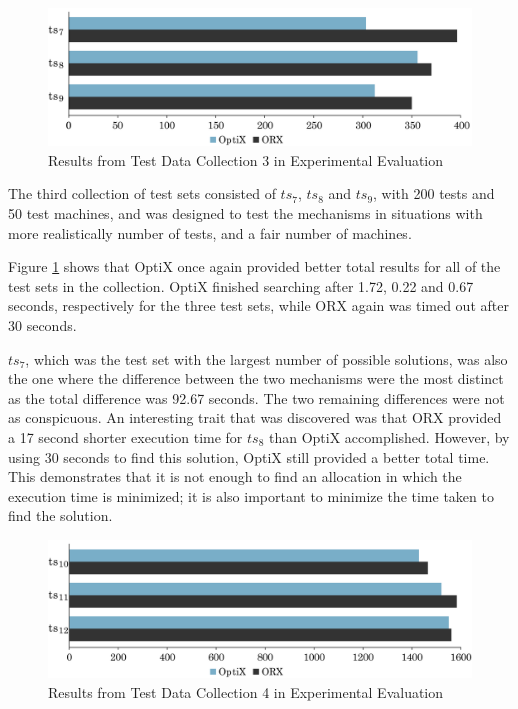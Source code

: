 \begin{figure}[b]
    \centering
    \includegraphics[width=\textwidth]{figures/test_results/3.pdf}
    \caption{Results from Test Data Collection 3 in Experimental Evaluation}
    \label{3rd_test_set}
\end{figure}

The third collection of test sets consisted of $ts_7$, $ts_8$ and $ts_9$, with 200 tests and 50 test machines, and was designed to test the mechanisms in situations with more realistically number of tests, and a fair number of machines.

Figure \ref{3rd_test_set} shows that OptiX once again provided better total results for all of the test sets in the collection. OptiX finished searching after 1.72, 0.22 and 0.67 seconds, respectively for the three test sets, while ORX again was timed out after 30 seconds.

$ts_7$, which was the test set with the largest number of possible solutions, was also the one where the difference between the two mechanisms were the most distinct as the total difference was 92.67 seconds. The two remaining differences were not as conspicuous. An interesting trait that was discovered was that ORX provided a 17 second shorter execution time for $ts_8$ than OptiX accomplished. However, by using 30 seconds to find this solution, OptiX still provided a better total time. This demonstrates that it is not enough to find an allocation in which the execution time is minimized; it is also important to minimize the time taken to find the solution. 

\begin{figure}[t]
    \centering
    \includegraphics[width=\textwidth]{figures/test_results/4.pdf}
    \caption{Results from Test Data Collection 4 in Experimental Evaluation}
    \label{4th_test_set}
\end{figure}

